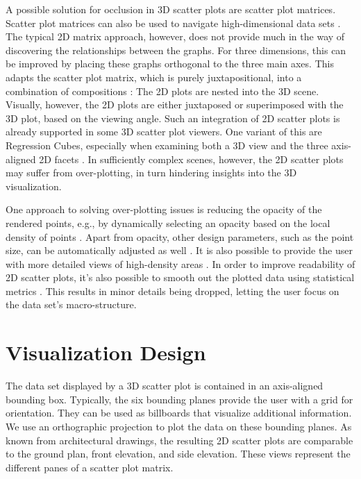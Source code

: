 \documentclass[sigconf]{acmart}
\begin{document}
A possible solution for occlusion in 3D scatter plots are scatter plot matrices.
Scatter plot matrices can also be used to navigate high-dimensional data sets \cite{scatplotnav}.
The typical 2D matrix approach, however, does not provide much in the way of discovering the relationships between the graphs.
For three dimensions, this can be improved by placing these graphs orthogonal to the three main axes.
This adapts the scatter plot matrix, which is purely juxtapositional, into a combination of compositions \cite{compositeVis}:
The 2D plots are nested into the 3D scene.
Visually, however, the 2D plots are either juxtaposed or superimposed with the 3D plot, based on the viewing angle.
Such an integration of 2D scatter plots is already supported in some 3D scatter plot viewers.
One variant of this are Regression Cubes, especially when examining both a 3D view and the three axis-aligned 2D facets \cite{regrCubes}.
In sufficiently complex scenes, however, the 2D scatter plots may suffer from over-plotting, in turn hindering insights into the 3D visualization.

One approach to solving over-plotting issues is reducing the opacity of the rendered points, e.g., by dynamically selecting an opacity based on the local density of points \cite{dynOpacity2dSP}.
Apart from opacity, other design parameters, such as the point size, can be automatically adjusted as well \cite{spPerceptOpti}.
It is also possible to provide the user with more detailed views of high-density areas \cite{nestedSP}.
In order to improve readability of 2D scatter plots, it's also possible to smooth out the plotted data using statistical metrics \cite{spSmoothing}.
This results in minor details being dropped, letting the user focus on the data set's macro-structure.

\section{Visualization Design}
\label{sec:design}

The data set displayed by a 3D scatter plot is contained in an axis-aligned bounding box.
Typically, the six bounding planes provide the user with a grid for orientation.
They can be used as billboards that visualize additional information.
We use an orthographic projection to plot the data on these bounding planes.
As known from architectural drawings, the resulting 2D scatter plots are comparable to the ground plan, front elevation, and side elevation.
These views represent the different panes of a scatter plot matrix.
\end{document}
